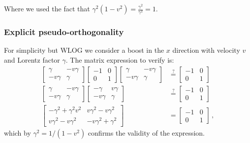 \documentclass[main.tex]{subfiles}
\begin{document}
Where we used the fact that $\gamma^2(1-v^2)=\frac{\gamma^2}{\gamma^2}=1$.
\subsubsection{Explicit pseudo-orthogonality}

For simplicity but WLOG we consider a boost in the \(x\) direction with velocity \(v\) and Lorentz factor \(\gamma\). The matrix expression to verify is:
%
\begin{subequations}
\begin{align}
  \begin{bmatrix}
  \gamma    & - v \gamma  \\
    -v \gamma & \gamma
  \end{bmatrix}
  \begin{bmatrix}
    -1 & 0 \\
    0 & 1
  \end{bmatrix}
  \begin{bmatrix}
    \gamma & -v \gamma \\
     -v \gamma&  \gamma
  \end{bmatrix}
  &\overset{?}{=}
  \begin{bmatrix}
  -1   & 0 \\
  0   & 1
\end{bmatrix} \\
  \begin{bmatrix}
  \gamma    & - v \gamma  \\
    -v \gamma & \gamma
  \end{bmatrix}
  \begin{bmatrix}
    -\gamma & v \gamma \\
    -v \gamma&  \gamma
  \end{bmatrix}
  &\overset{?}{=}
  \begin{bmatrix}
  -1   & 0 \\
  0   & 1
\end{bmatrix} \\
  \begin{bmatrix}
  -\gamma^2 + \gamma^2 v^2    & v \gamma^2 - v \gamma^2  \\
    v \gamma^2 -v \gamma^2 & -v\gamma^2 +\gamma^2
  \end{bmatrix}
  &=
  \begin{bmatrix}
  -1   & 0 \\
  0   & 1
\end{bmatrix}\,,
\end{align}
\end{subequations}
%
which by \(\gamma^2 = 1/ (1-v^2)\) confirms the validity of the expression.
\end{document}
